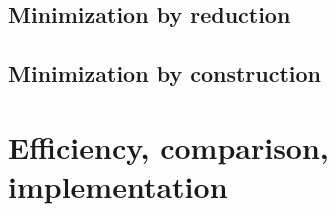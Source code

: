 \documentclass[a4paper]{report}
\begin{document}

\section{Minimization by reduction}










\section{Minimization by construction}








\chapter{Efficiency, comparison, implementation}








	
\end{document}
